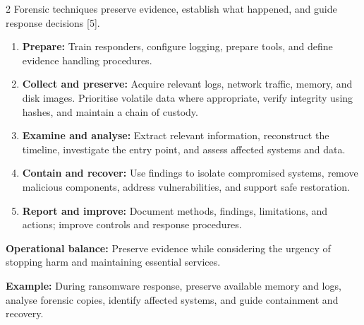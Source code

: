 \documentclass[11pt,a4paper]{article}
\begin{document}
\begin{multicols}{2}
Forensic techniques preserve evidence, establish what
happened, and guide response decisions [5].
\begin{enumerate}
\item \textbf{Prepare:} Train responders, configure logging,
prepare tools, and define evidence handling procedures.
\item \textbf{Collect and preserve:} Acquire relevant logs,
network traffic, memory, and disk images. Prioritise volatile
data where appropriate, verify integrity using hashes,
and maintain a chain of custody.
\item \textbf{Examine and analyse:} Extract relevant information,
reconstruct the timeline, investigate the entry point,
and assess affected systems and data.
\item \textbf{Contain and recover:} Use findings to isolate
compromised systems, remove malicious components, address
vulnerabilities, and support safe restoration.
\item \textbf{Report and improve:} Document methods,
findings, limitations, and actions; improve controls and
response procedures.
\end{enumerate}

\textbf{Operational balance:} Preserve evidence while
considering the urgency of stopping harm and maintaining
essential services.

\textbf{Example:} During ransomware response, preserve
available memory and logs, analyse forensic copies,
identify affected systems, and guide containment and recovery.

\end{multicols}

\newpage
\end{document}
